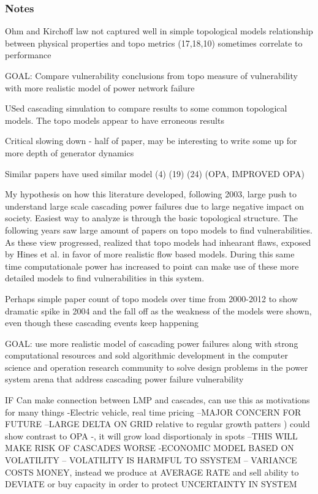 \subsubsection{Notes}



Ohm and Kirchoff law not captured well in simple topological models
relationship between physical properties and topo metrics (17,18,10) sometimes correlate to performance

GOAL: Compare vulnerability conclusions from topo measure of vulnerability with more realistic model of power network failure


USed cascading simulation to compare results to some common topological models.  The topo models appear to have erroneous results


Critical slowing down - half of paper, may be interesting to write some up for more depth of generator dynamics




  Similar papers have used similar model (4) (19) (24)  (OPA, IMPROVED OPA)


My hypothesis on how this literature developed, following 2003, large push to understand large scale cascading power failures due to large negative impact on society.  Easiest way to analyze is through the basic topological structure.  The following years saw large amount of papers on topo models to find vulnerabilities.  As these view progressed, realized that topo models had inhearant flaws, exposed by Hines et al. in favor of more realistic flow based models.  During this same time computationale power has increased to point can make use of these more detailed models to find vulnerabilities in this system.  

Perhaps simple paper count of topo models over time from 2000-2012 to show dramatic spike in 2004 and the fall off as the weakness of the models were shown, even though these cascading events keep happening

GOAL: use more realistic model of cascading power failures along with strong computational resources and sold algorithmic development in the computer science and operation research community to solve design problems in the power system arena that address cascading power failure vulnerability


IF Can make connection between LMP and cascades, can use this as motivations for many things
-Electric vehicle, real time pricing
--MAJOR CONCERN FOR FUTURE
--LARGE DELTA ON GRID relative to regular growth patters )  could show contrast to OPA -, it will grow load disportionaly in spots
--THIS WILL MAKE RISK OF CASCADES WORSE
-ECONOMIC MODEL BASED ON VOLATILITY  -- VOLATILITY IS HARMFUL TO SSYSTEM  -- VARIANCE COSTS MONEY, instead we produce at AVERAGE RATE and sell ability to DEVIATE or buy capacity in order to protect UNCERTAINTY IN SYSTEM

